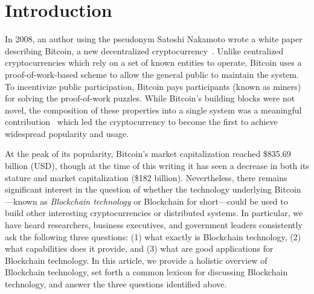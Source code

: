 
\section{Introduction}

In 2008, an author using the pseudonym Satoshi Nakamoto wrote a white paper describing Bitcoin, a new decentralized cryptocurrency~\cite{Nak08}.
Unlike centralized cryptocurrencies which rely on a set of known entities to 
operate, Bitcoin uses a proof-of-work-based scheme to allow the general public 
to maintain the system. %
To incentivize public participation, Bitcoin pays participants (known as miners) for solving the proof-of-work puzzles.
While Bitcoin's building blocks were not novel, the composition of these properties into a single system was a meaningful contribution~\cite{Narayanan17} which led the cryptocurrency to become the first to achieve widespread popularity and usage.

At the peak of its popularity, Bitcoin's market capitalization reached \$835.69 billion (USD), though at the time of this writing it has seen a decrease in both its stature and market capitalization (\$182 billion).
Nevertheless, there remains significant interest in the question of whether the technology underlying Bitcoin---known as \emph{Blockchain technology} or {Blockchain} for short---could be used to build other interesting cryptocurrencies or distributed systems.
In particular, we have heard researchers, business executives, and government 
leaders consistently ask the following three questions: (1) what exactly is 
Blockchain technology, (2) what capabilities does it provide, and (3) what are 
good applications for Blockchain technology.%
%
In this article, 
we provide a holistic overview of Blockchain technology, set forth a common 
lexicon for discussing Blockchain technology, and answer the three questions 
identified above.

